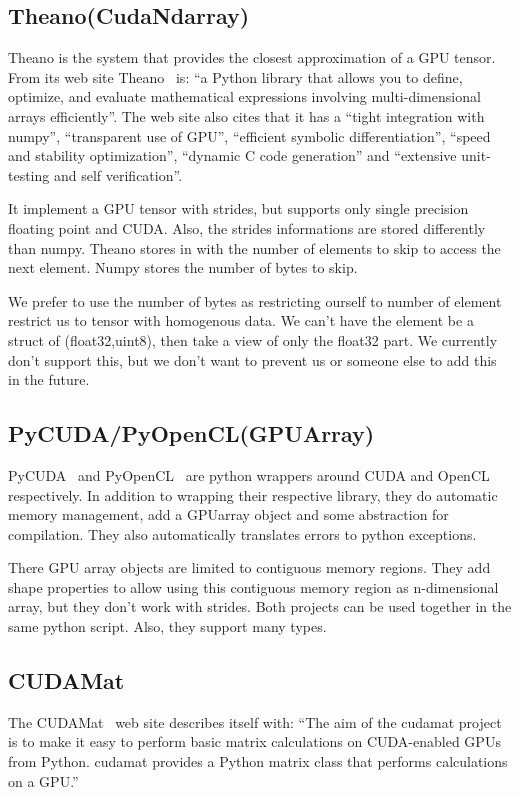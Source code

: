 \documentclass{article} %
\begin{document}
\subsection{Theano(CudaNdarray)}
Theano is the system that provides the closest approximation of a GPU tensor. From its web site Theano~\citep{bergstra+al:2010-scipy} is:
``a Python library that allows you to define, optimize, and evaluate mathematical expressions involving multi-dimensional arrays efficiently''. The web site also cites that it has a ``tight integration with numpy'', ``transparent use of GPU'', ``efficient symbolic differentiation'', ``speed and stability optimization'', ``dynamic C code generation'' and ``extensive unit-testing and self verification''.

It implement a GPU tensor with strides, but supports only single precision floating point and CUDA. Also, the strides informations are stored differently than numpy. Theano stores in with the number of elements to skip to access the next element. Numpy stores the number of bytes to skip.

We prefer to use the number of bytes as restricting ourself to number of element restrict us to tensor with homogenous data. We can't have the element be a struct of (float32,uint8), then take a view of only the float32 part. We currently don't support this, but we don't want to prevent us or someone else to add this in the future.

\subsection{PyCUDA/PyOpenCL(GPUArray)}
PyCUDA~\citep{kloeckner_pycuda_2009} and PyOpenCL~\citep{kloeckner_pycuda_2009} are python wrappers around CUDA and OpenCL respectively. In addition to wrapping their respective library, they do automatic memory management, add a GPUarray object and some abstraction for compilation. They also automatically translates errors to python exceptions.

There GPU array objects are limited to contiguous memory regions. They add shape properties to allow using this contiguous memory region as n-dimensional array, but they don't work with strides. Both projects can be used together in the same python script. Also, they support many types.

\subsection{CUDAMat}
The CUDAMat~\citep{cudamat-TR2009} web site describes itself with: ``The aim of the cudamat project is to make it easy to perform basic matrix calculations on CUDA-enabled GPUs from Python. cudamat provides a Python matrix class that performs calculations on a GPU.''
\end{document}
